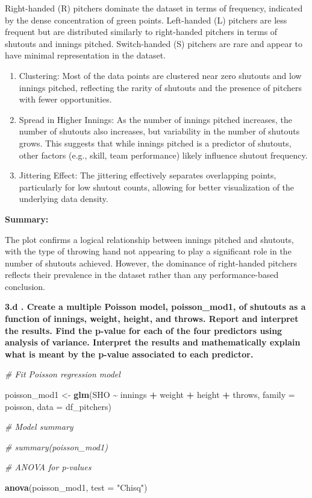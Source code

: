 \documentclass[
]{article}
\newenvironment{Shaded}{\begin{snugshade}}{\end{snugshade}}
\newcommand{\AttributeTok}[1]{\textcolor[rgb]{0.13,0.29,0.53}{#1}}
\newcommand{\CommentTok}[1]{\textcolor[rgb]{0.56,0.35,0.01}{\textit{#1}}}
\newcommand{\FunctionTok}[1]{\textcolor[rgb]{0.13,0.29,0.53}{\textbf{#1}}}
\newcommand{\NormalTok}[1]{#1}
\newcommand{\OtherTok}[1]{\textcolor[rgb]{0.56,0.35,0.01}{#1}}
\newcommand{\SpecialCharTok}[1]{\textcolor[rgb]{0.81,0.36,0.00}{\textbf{#1}}}
\newcommand{\StringTok}[1]{\textcolor[rgb]{0.31,0.60,0.02}{#1}}
\begin{document}
Right-handed (R) pitchers dominate the dataset in terms of frequency,
indicated by the dense concentration of green points. Left-handed (L)
pitchers are less frequent but are distributed similarly to right-handed
pitchers in terms of shutouts and innings pitched. Switch-handed (S)
pitchers are rare and appear to have minimal representation in the
dataset.

\begin{enumerate}
\def\labelenumi{\arabic{enumi}.}
\setcounter{enumi}{2}
\item
  Clustering: Most of the data points are clustered near zero shutouts
  and low innings pitched, reflecting the rarity of shutouts and the
  presence of pitchers with fewer opportunities.
\item
  Spread in Higher Innings: As the number of innings pitched increases,
  the number of shutouts also increases, but variability in the number
  of shutouts grows. This suggests that while innings pitched is a
  predictor of shutouts, other factors (e.g., skill, team performance)
  likely influence shutout frequency.
\item
  Jittering Effect: The jittering effectively separates overlapping
  points, particularly for low shutout counts, allowing for better
  visualization of the underlying data density.
\end{enumerate}

\textbf{Summary:}

The plot confirms a logical relationship between innings pitched and
shutouts, with the type of throwing hand not appearing to play a
significant role in the number of shutouts achieved. However, the
dominance of right-handed pitchers reflects their prevalence in the
dataset rather than any performance-based conclusion.

\textbf{3.d . Create a multiple Poisson model, poisson\_mod1, of
shutouts as a function of innings, weight, height, and throws. Report
and interpret the results. Find the p-value for each of the four
predictors using analysis of variance. Interpret the results and
mathematically explain what is meant by the p-value associated to each
predictor.}

\begin{Shaded}
\begin{Highlighting}[]
\CommentTok{\# Fit Poisson regression model}

\NormalTok{poisson\_mod1 }\OtherTok{\textless{}{-}} \FunctionTok{glm}\NormalTok{(SHO }\SpecialCharTok{\textasciitilde{}}\NormalTok{ innings }\SpecialCharTok{+}\NormalTok{ weight }\SpecialCharTok{+}\NormalTok{ height }\SpecialCharTok{+}\NormalTok{ throws, }
                    \AttributeTok{family =}\NormalTok{ poisson, }\AttributeTok{data =}\NormalTok{ df\_pitchers)}

\CommentTok{\# Model summary}

\CommentTok{\# summary(poisson\_mod1)}

\CommentTok{\# ANOVA for p{-}values}

\FunctionTok{anova}\NormalTok{(poisson\_mod1, }\AttributeTok{test =} \StringTok{"Chisq"}\NormalTok{)}
\end{Highlighting}
\end{Shaded}
\end{document}
